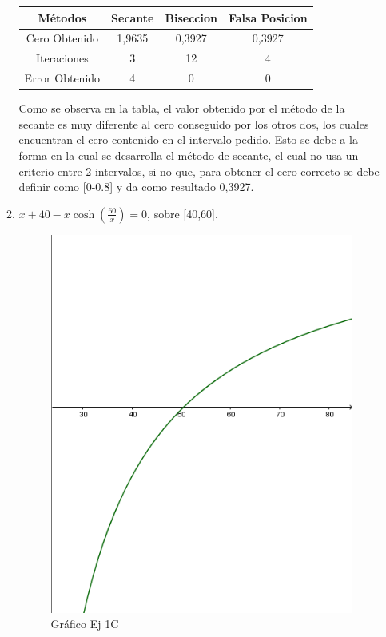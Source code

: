 \documentclass{udpreport}
\begin{document}
\begin{enumerate}
\begin{enumerate}
        \begin{table}[H]
        \centering
            \begin{tabular} { |c|c|c|c|}
            
            \hline
            Métodos       & Secante & Biseccion & Falsa Posicion \\
            \hline
            Cero Obtenido &  1,9635       &    0,3927       &      0,3927           \\
            \hline
            Iteraciones   &     3        &      12     &        4         \\
            \hline
            Error Obtenido &     4      &     0        &    0  \\
            \hline
            
            \end{tabular}
        \end{table}
        Como se observa en la tabla, el valor obtenido por el método de la secante es muy diferente al cero 
        conseguido por los otros dos, los cuales encuentran el cero contenido en el intervalo pedido. Esto se debe a la forma en la cual se desarrolla el método de secante, el cual no usa un criterio entre 2 intervalos, si no que, para obtener el cero correcto se debe definir como [0-0.8] y da como resultado 0,3927.    
        
        
    
    \item \(x + 40 -x\cosh(\frac{60}{x}) = 0 \), sobre [40,60].\\
        \begin{figure}[H]
            \centering
            \includegraphics[width=10cm]{GraficoEj1c}
            \caption{Gráfico Ej 1C}
        \end{figure}
            \begin{table}[H]
            \centering
                \begin{tabular} { |c|c|c|c|}
                

\end{tabular}
\end{table}
\end{enumerate}
\end{enumerate}
\end{document}
